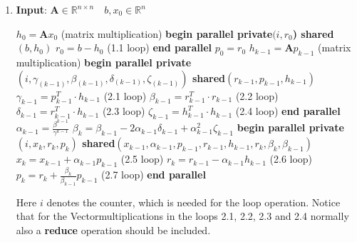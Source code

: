\documentclass{article}
\begin{document}
\begin{enumerate}[label=(\alph*)]
  \item \textbf{Input}: $ \textbf{A} \in \mathbb{R}^{n\times n} \quad b, x_0\in \mathbb{R}^n$
    \begin{algorithmic}[1]
	\State $h_{0} = \textbf{A}x_{0}$ (matrix multiplication)
	\State \textbf{begin parallel private$(i, r_{0}$) shared$(b, h_{0})$}
	\State $r_0 = b - h_0$ (1.1 loop)
	\State \textbf{end parallel}
	\State $p_0 = r_0$
	\State $h_{k-1} = \textbf{A}p_{k-1}$ (matrix multiplication)
	\State \textbf{begin parallel private$(i, \gamma_{(k-1)}, \beta_{(k-1)}, \delta_{(k-1)}, \zeta_{(k-1)})$ shared$(r_{k-1},p_{k-1},h_{k-1})$}
	\State $\gamma_{k-1} = p^{T}_{k-1}\cdot h_{k-1}$ (2.1 loop)
	\State $\beta_{k-1} = r^{T}_{k-1}\cdot r_{k-1}$ (2.2 loop)
	\State $\delta_{k-1} = r^{T}_{k-1}\cdot h_{k-1}$ (2.3 loop)
	\State $\zeta_{k-1} = h^{T}_{k-1}\cdot h_{k-1}$ (2.4 loop)
	\State \textbf{end parallel}
	\State $\alpha_{k-1} = \frac{\beta^{k-1}}{\gamma^{k-1}}$
	\State $\beta_{k} = \beta_{k-1} - 2 \alpha_{k-1} \delta_{k-1} + \alpha_{k-1}^2\zeta_{k-1}$
	\State \textbf{begin parallel private$(i, x_{k}, r_{k}, p_{k})$ shared$(x_{k-1}, \alpha_{k-1}, p_{k-1}, r_{k-1}, h_{k-1},  r_{k},  \beta_{k}, \beta_{k-1})$}
	\State $x_k = x_{k-1} + \alpha_{k-1}p_{k-1}$ (2.5 loop)
	\State $r_k = r_{k-1} - \alpha_{k-1}h_{k-1}$ (2.6 loop)
	\State $p_k = r_{k} + \frac{\beta_k}{\beta_{k-1}}p_{k-1}$ (2.7 loop)
 	\State \textbf{end parallel}
	\EndFor
    \end{algorithmic}
Here $i$ denotes the counter, which is needed for the loop operation. Notice that for the Vectormultiplications in the loops 2.1, 2.2, 2.3 and 2.4 normally also a \textbf{reduce} operation should be included.


\end{enumerate}
\end{document}
